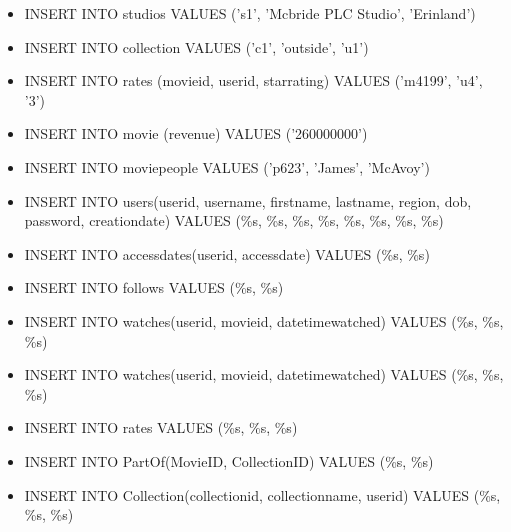 \documentclass[12pt]{article}
\begin{document}
\begin{itemize}
    \item INSERT INTO studios VALUES ('s1', 'Mcbride PLC Studio', 'Erinland')
    \item INSERT INTO collection VALUES ('c1', 'outside', 'u1')
    \item INSERT INTO rates (movieid, userid, starrating) VALUES ('m4199', 'u4', '3')
    \item INSERT INTO movie (revenue) VALUES ('260000000')
    \item INSERT INTO moviepeople VALUES ('p623', 'James', 'McAvoy')\\
\end{itemize}

\begin{itemize}
    \item INSERT INTO users(userid, username, firstname, lastname, region, dob, password, creationdate) VALUES (\%s, \%s, \%s, \%s, \%s, \%s, \%s, \%s)
    \item INSERT INTO accessdates(userid, accessdate) VALUES (\%s, \%s)
    \item INSERT INTO follows VALUES (\%s, \%s)
    \item INSERT INTO watches(userid, movieid, datetimewatched) VALUES (\%s, \%s, \%s)
    \item INSERT INTO watches(userid, movieid, datetimewatched) VALUES (\%s, \%s, \%s)
    \item INSERT INTO rates VALUES (\%s, \%s, \%s)
    \item INSERT INTO PartOf(MovieID, CollectionID) VALUES (\%s, \%s)
    \item INSERT INTO Collection(collectionid, collectionname, userid) VALUES (\%s, \%s, \%s)
\end{itemize}

\end{document}
